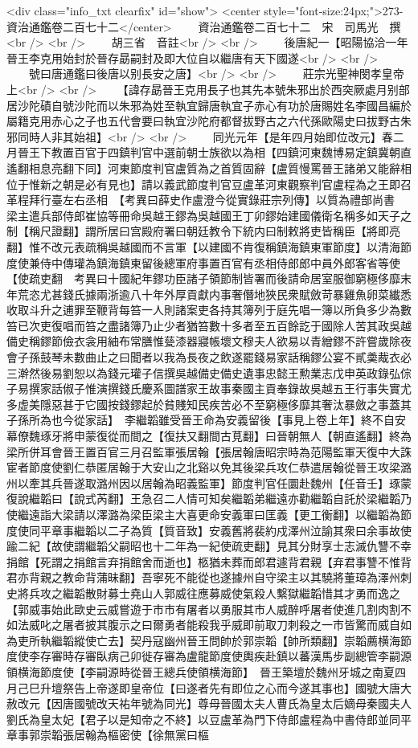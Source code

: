 <div class="info_txt clearfix" id="show">
<center style="font-size:24px;">273-資治通鑑卷二百七十二</center>
  　　資治通鑑卷二百七十二　宋　司馬光　撰<br />
<br />
　　胡三省　音註<br />
<br />
　　後唐紀一【昭陽協洽一年晉王李克用始封於晉存勗嗣封及即大位自以繼唐有天下國遂<br />
<br />
　　號曰唐通鑑曰後唐以别長安之唐】<br />
<br />
　　莊宗光聖神閔孝皇帝上<br />
<br />
　　【諱存勗晉王克用長子也其先本號朱邪出於西突厥處月别部居沙陀磧自號沙陀而以朱邪為姓至執宜歸唐執宜子赤心有功於唐賜姓名李國昌編於屬籍克用赤心之子也五代會要曰執宜沙陀府都督拔野古之六代孫歐陽史曰拔野古朱邪同時人非其始祖】<br />
<br />
　　同光元年【是年四月始即位改元】春二月晉王下教置百官于四鎮判官中選前朝士族欲以為相【四鎮河東魏博易定鎮冀朝直遙翻相息亮翻下同】河東節度判官盧質為之首質固辭【盧質慢罵晉王諸弟又能辭相位于惟新之朝是必有見也】請以義武節度判官豆盧革河東觀察判官盧程為之王即召革程拜行臺左右丞相　【考異曰薛史作盧澄今從實錄莊宗列傳】以質為禮部尚書　梁主遣兵部侍郎崔協等冊命吳越王鏐為吳越國王丁卯鏐始建國儀衛名稱多如天子之制【稱尺證翻】謂所居曰宫殿府署曰朝廷教令下統内曰制敕將吏皆稱臣【將即亮翻】惟不改元表疏稱吳越國而不言軍【以建國不肯復稱鎮海鎮東軍節度】以清海節度使兼侍中傳瓘為鎮海鎮東留後總軍府事置百官有丞相侍郎郎中員外郎客省等使【使疏吏翻　考異曰十國紀年鏐功臣諸子領節制皆署而後請命居室服御窮極侈靡末年荒恣尤甚錢氏據兩浙逾八十年外厚貢獻内事奢僭地狹民衆賦斂苛暴雞魚卵菜纎悉收取斗升之逋罪至鞭背每笞一人則諸案吏各持其簿列于庭先唱一簿以所負多少為數笞已次吏復唱而笞之盡諸簿乃止少者猶笞數十多者至五百餘訖于國除人苦其政吳越備史稱鏐節儉衣衾用紬布常膳惟甆漆器寢帳壞文穆夫人欲易以青繒鏐不許嘗歲除夜會子孫鼓琴未數曲止之曰聞者以我為長夜之飲遂罷錢易家話稱鏐公宴不貳羮胾衣必三澣然後易劉恕以為錢元瓘子信撰吳越備史備史遺事忠懿王勲業志戊申英政錄弘倧子易撰家話俶子惟演撰錢氏慶系圖譜家王故事秦國主貢奉錄故吳越五王行事失實尤多虚美隱惡甚于它國按錢鏐起於貧賤知民疾苦必不至窮極侈靡其奢汰暴斂之事蓋其子孫所為也今從家話】　李繼韜雖受晉王命為安義留後【事見上卷上年】終不自安幕僚魏琢牙將申蒙復從而間之【復扶又翻間古莧翻】曰晉朝無人【朝直遙翻】終為梁所併耳會晉王置百官三月召監軍張居翰【張居翰唐昭宗時為范陽監軍天復中大誅宦者節度使劉仁恭匿居翰于大安山之北谿以免其後梁兵攻仁恭遣居翰從晉王攻梁潞州以牽其兵晉遂取潞州因以居翰為昭義監軍】節度判官任圜赴魏州【任音壬】琢蒙復說繼韜曰【說式芮翻】王急召二人情可知矣繼韜弟繼遠亦勸繼韜自託於梁繼韜乃使繼遠詣大梁請以澤潞為梁臣梁主大喜更命安義軍曰匡義【更工衡翻】以繼韜為節度使同平章事繼韜以二子為質【質音致】安義舊將裴約戍澤州泣諭其衆曰余事故使踰二紀【故使謂繼韜父嗣昭也十二年為一紀使疏吏翻】見其分財享士志滅仇讐不幸捐館【死謂之捐館言弃捐館舍而逝也】柩猶未葬而郎君遽背君親【弃君事讐不惟背君亦背親之教命背蒲昧翻】吾寧死不能從也遂據州自守梁主以其驍將董璋為澤州刺史將兵攻之繼韜散財募士堯山人郭威往應募威使氣殺人繫獄繼韜惜其才勇而逸之【郭威事始此歐史云威嘗遊于市市有屠者以勇服其市人威醉呼屠者使進几割肉割不如法威叱之屠者披其腹示之曰爾勇者能殺我乎威即前取刀刺殺之一市皆驚而威自如為吏所執繼韜縱使亡去】契丹寇幽州晉王問帥於郭崇韜【帥所類翻】崇韜薦横海節度使李存審時存審臥病己卯徙存審為盧龍節度使輿疾赴鎮以蕃漢馬步副總管李嗣源領横海節度使【李嗣源時從晉王總兵使領横海節】　晉王築壇於魏州牙城之南夏四月己巳升壇祭告上帝遂即皇帝位【曰遂者先有即位之心而今遂其事也】國號大唐大赦改元【因唐國號改天祐年號為同光】尊母晉國太夫人曹氏為皇太后嫡母秦國夫人劉氏為皇太妃【君子以是知帝之不終】以豆盧革為門下侍郎盧程為中書侍郎並同平章事郭崇韜張居翰為樞密使【徐無黨曰樞